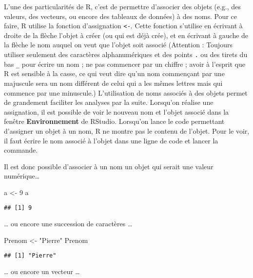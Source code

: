 \documentclass[
]{book}
\newenvironment{Shaded}{\begin{snugshade}}{\end{snugshade}}
\newcommand{\DecValTok}[1]{\textcolor[rgb]{0.00,0.00,0.81}{#1}}
\newcommand{\NormalTok}[1]{#1}
\newcommand{\OtherTok}[1]{\textcolor[rgb]{0.56,0.35,0.01}{#1}}
\newcommand{\StringTok}[1]{\textcolor[rgb]{0.31,0.60,0.02}{#1}}
\begin{document}
L'une des particularités de R, c'est de permettre d'associer des objets (e.g., des valeurs, des vecteurs, ou encore des tableaux de données) à des noms. Pour ce faire, R utilise la fonction d'assignation \texttt{\textless{}-}. Cette fonction s'utilise en écrivant à droite de la flèche l'objet à créer (ou qui est déjà crée), et en écrivant à gauche de la flèche le nom auquel on veut que l'objet soit associé (Attention : Toujours utiliser seulement des caractères alphanumériques et des points \texttt{.} ou des tirets du bas \texttt{\_} pour écrire un nom ; ne pas commencer par un chiffre ; avoir à l'esprit que R est sensible à la casse, ce qui veut dire qu'un nom commençant par une majuscule sera un nom différent de celui qui a les mêmes lettres mais qui commence par une minuscule.) L'utilisation de noms associés à des objets permet de grandement faciliter les analyses par la suite. Lorsqu'on réalise une assignation, il est possible de voir le nouveau nom et l'objet associé dans la fenêtre \textbf{Environnement} de RStudio. Lorsqu'on lance le code permettant d'assigner un objet à un nom, R ne montre pas le contenu de l'objet. Pour le voir, il faut écrire le nom associé à l'objet dans une ligne de code et lancer la commande.

Il est donc possible d'associer à un nom un objet qui serait une valeur numérique\ldots{}

\begin{Shaded}
\begin{Highlighting}[]
\NormalTok{a }\OtherTok{\textless{}{-}} \DecValTok{9}
\NormalTok{a}
\end{Highlighting}
\end{Shaded}

\begin{verbatim}
## [1] 9
\end{verbatim}

\ldots{} ou encore une succession de caractères \ldots{}

\begin{Shaded}
\begin{Highlighting}[]
\NormalTok{Prenom }\OtherTok{\textless{}{-}} \StringTok{"Pierre"}
\NormalTok{Prenom}
\end{Highlighting}
\end{Shaded}

\begin{verbatim}
## [1] "Pierre"
\end{verbatim}

\ldots{} ou encore un vecteur \ldots{}
\end{document}
